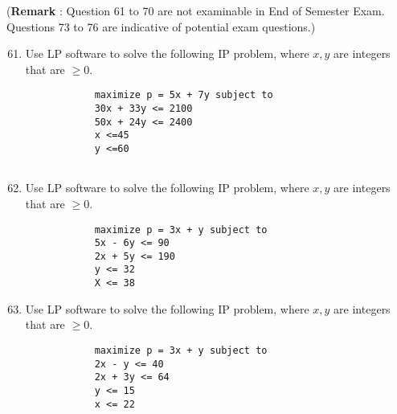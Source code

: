 \documentclass[a4paper,12pt]{article}
\begin{document}
 \noindent (\textbf{Remark} : Question 61 to 70 are not examinable in End of Semester Exam. Questions 73 to 76 are indicative of potential exam questions.)
 	\begin{enumerate}
 		\setcounter{enumi}{60}	
 		
 		
 		
 		\item Use LP software to solve the following IP problem, where $x,y$ are integers that are $\geq 0$.
 		\begin{framed}
 			\begin{verbatim}
 			maximize p = 5x + 7y subject to
 			30x + 33y <= 2100
 			50x + 24y <= 2400
 			x <=45
 			y <=60
 			
 			\end{verbatim}
 		\end{framed}
 		
 		
 		
 		
 		
 		
 		\item Use LP software to solve the following IP problem, where $x,y$ are integers that are $\geq 0$.
 		\begin{framed}
 			\begin{verbatim}
 			maximize p = 3x + y subject to
 			5x - 6y <= 90
 			2x + 5y <= 190
 			y <= 32
 			X <= 38
 			\end{verbatim}
 		\end{framed}
 		
 		
 		
 		
 		\item Use LP software to solve the following IP problem, where $x,y$ are integers that are $\geq 0$.
 		\begin{framed}
 			\begin{verbatim}
 			maximize p = 3x + y subject to
 			2x - y <= 40
 			2x + 3y <= 64
 			y <= 15
 			x <= 22
 			\end{verbatim}
 		\end{framed}
 		
 		
 		

\end{enumerate}
\end{document}
